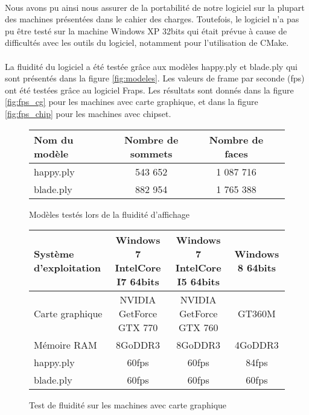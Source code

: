 \paragraph{}
Nous avons pu ainsi nous assurer de la portabilité de notre logiciel sur la plupart des machines présentées dans le cahier des charges. Toutefois, le logiciel n'a pas pu être testé sur la machine Windows XP 32bits qui était prévue à cause de difficultés avec les outils du logiciel, notamment pour l'utilisation de CMake.

\paragraph{}
La fluidité du logiciel a été testée grâce aux modèles happy.ply et blade.ply qui sont présentés dans la figure \ref{fig:modeles}. Les valeurs de frame par seconde (fps) ont été testées grâce au logiciel Fraps\footnotemark. Les résultats sont donnés dans la figure \ref{fig:fps_cg} pour les machines avec carte graphique, et dans la figure \ref{fig:fps_chip} pour les machines avec chipset.

\begin{figure}[h]
  \begin{changemargin}{-4cm}{-4cm}
    \centering
    \begin{tabular}{|l|c|c|c|}
      \hline
      Nom du modèle & Nombre de sommets & Nombre de faces \\ \hline
      happy.ply & 543 652 & 1 087 716 \\ \hline
      blade.ply & 882 954 & 1 765 388 \\ \hline
    \end{tabular}
  \end{changemargin}
  \caption{Modèles testés lors de la fluidité d'affichage}
  \label{tab:modeles}
\end{figure}

\begin{figure}[h]
  \begin{changemargin}{-4cm}{-4cm}
    \centering
    \begin{tabular}{|l|c|c|c|}
      \hline
      Système d'exploitation & Windows 7 IntelCore I7 64bits & Windows 7 IntelCore I5 64bits & Windows 8 64bits\\ \hline
      Carte graphique &  NVIDIA GetForce GTX 770 & NVIDIA GetForce GTX 760 & GT360M \\ \hline
      Mémoire RAM & 8GoDDR3 & 8GoDDR3 & 4GoDDR3 \\ \hline \hline
      happy.ply & 60fps & 60fps & 84fps \\ \hline
      blade.ply & 60fps & 60fps & 60fps\\ \hline
    \end{tabular}
  \end{changemargin}
  \caption{Test de fluidité sur les machines avec carte graphique}
  \label{tab:fps_cg}
\end{figure}


